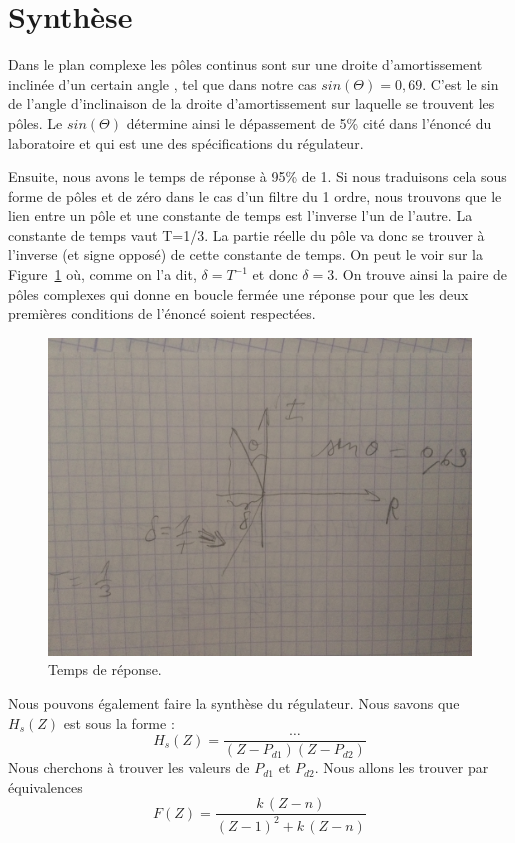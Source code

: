 \section{Synthèse}

Dans le plan complexe les pôles continus sont sur une droite d'amortissement inclinée d'un certain angle \Theta{}, tel que dans notre cas $sin(\Theta) = 0,69$.
C'est le sin de l'angle d'inclinaison de la droite d'amortissement sur laquelle se trouvent les pôles.
Le $sin(\Theta)$ détermine ainsi le dépassement de 5\% cité dans l'énoncé du laboratoire et qui est une des spécifications du régulateur.

Ensuite, nous avons le temps de réponse à 95\% de 1.
Si nous traduisons cela sous forme de pôles et de zéro dans le cas d'un filtre du 1 ordre, nous trouvons que le lien entre un pôle et une constante de temps est l'inverse l'un de l'autre.
La constante de temps vaut T=1/3.
La partie réelle du pôle va donc se trouver à l'inverse (et signe opposé) de cette constante de temps.
On peut le voir sur la Figure~\ref{fig:temps-de-reponse} où, comme on l'a dit, $\delta = T^{-1}$ et donc $\delta = 3$.
On trouve ainsi la paire de pôles complexes  qui donne en boucle fermée une réponse pour que les deux premières conditions de l'énoncé soient respectées.

\begin{figure}[!ht]
	\centering
	\includegraphics[scale=0.1]{images/IMG_1681.jpg}
	\caption{Temps de réponse.}
	\label{fig:temps-de-reponse}
\end{figure}

Nous pouvons également faire la synthèse du régulateur.
Nous savons que $H_s(Z)$ est sous la forme :
\begin{equation}
	H_s(Z) = \frac{\dots}{(Z-P_{d1})(Z-P_{d2})}
\end{equation}
Nous cherchons à trouver les valeurs de $P_{d1}$ et $P_{d2}$.
Nous allons les trouver par équivalences
\begin{equation}
	F(Z) = \frac{k\,(Z-n)}{(Z-1)^2+k\,(Z-n)}
\end{equation}

